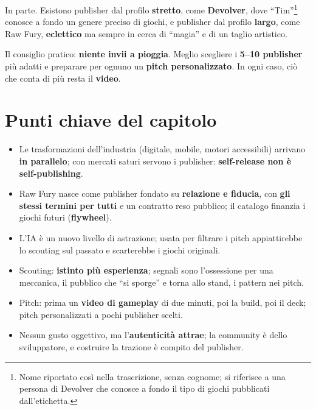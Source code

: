 In parte. Esistono publisher dal profilo \textbf{stretto}, come
\textbf{Devolver}, dove ``Tim''\footnote{Nome riportato così nella
trascrizione, senza cognome; si riferisce a una persona di Devolver che conosce a
fondo il tipo di giochi pubblicati dall'etichetta.} conosce a fondo un genere
preciso di giochi, e publisher dal profilo \textbf{largo}, come Raw Fury,
\textbf{eclettico} ma sempre in cerca di ``magia'' e di un taglio artistico.

Il consiglio pratico: \textbf{niente invii a pioggia}. Meglio scegliere i
\textbf{5--10 publisher} più adatti e preparare per ognuno un \textbf{pitch
personalizzato}. In ogni caso, ciò che conta di più resta il \textbf{video}.

\section*{Punti chiave del capitolo}

\begin{itemize}
  \item Le trasformazioni dell'industria (digitale, mobile, motori accessibili)
        arrivano \textbf{in parallelo}; con mercati saturi servono i publisher:
        \textbf{self-release non è self-publishing}.
  \item Raw Fury nasce come publisher fondato su \textbf{relazione e fiducia}, con
        \textbf{gli stessi termini per tutti} e un contratto reso pubblico; il
        catalogo finanzia i giochi futuri (\textbf{flywheel}).
  \item L'IA è un nuovo livello di astrazione; usata per filtrare i pitch
        appiattirebbe lo scouting sul passato e scarterebbe i giochi originali.
  \item Scouting: \textbf{istinto più esperienza}; segnali sono l'ossessione per
        una meccanica, il pubblico che ``si sporge'' e torna allo stand, i pattern
        nei pitch.
  \item Pitch: prima un \textbf{video di gameplay} di due minuti, poi la build,
        poi il deck; pitch personalizzati a pochi publisher scelti.
  \item Nessun gusto oggettivo, ma l'\textbf{autenticità attrae}; la community è
        dello sviluppatore, e costruire la trazione è compito del publisher.
\end{itemize}

